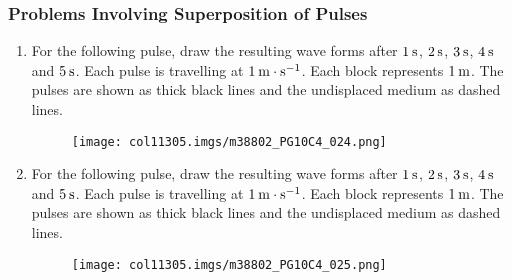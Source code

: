             \subsubsection{ Problems Involving Superposition of Pulses }
            \nopagebreak
            \label{m38802*id316401}\begin{enumerate}[noitemsep, label=\textbf{\arabic*}. ] 
            \label{m38802*uid55}\item For the following pulse, draw the resulting wave forms after $1\phantom{\rule{2pt}{0ex}}\mathrm{s}$, $2\phantom{\rule{2pt}{0ex}}\mathrm{s}$, $3\phantom{\rule{2pt}{0ex}}\mathrm{s}$, $4\phantom{\rule{2pt}{0ex}}\mathrm{s}$ and $5\phantom{\rule{2pt}{0ex}}\mathrm{s}$. Each pulse is travelling at $1\phantom{\rule{2pt}{0ex}}\mathrm{m}\ensuremath{\cdot}\mathrm{s}{}^{-1}$. Each block represents $1\phantom{\rule{2pt}{0ex}}\mathrm{m}$. The pulses are shown as thick black lines and the undisplaced medium as dashed lines.
    \setcounter{subfigure}{0}
	\begin{figure}[H] %
    \begin{center}
    \label{m38802*id316460!!!underscore!!!media}\label{m38802*id316460!!!underscore!!!printimage}\texttt{[image: col11305.imgs/m38802\_PG10C4\_024.png]} %
      \vspace{2pt}
    \vspace{.1in}
    \end{center}
 \end{figure}               \label{m38802*uid57}\item For the following pulse, draw the resulting wave forms after $1\phantom{\rule{2pt}{0ex}}\mathrm{s}$, $2\phantom{\rule{2pt}{0ex}}\mathrm{s}$, $3\phantom{\rule{2pt}{0ex}}\mathrm{s}$, $4\phantom{\rule{2pt}{0ex}}\mathrm{s}$ and $5\phantom{\rule{2pt}{0ex}}\mathrm{s}$. Each pulse is travelling at $1\phantom{\rule{2pt}{0ex}}\mathrm{m}\ensuremath{\cdot}\mathrm{s}{}^{-1}$. Each block represents $1\phantom{\rule{2pt}{0ex}}\mathrm{m}$. The pulses are shown as thick black lines and the undisplaced medium as dashed lines.
    \setcounter{subfigure}{0}
	\begin{figure}[H] %
    \begin{center}
    \label{m38802*id316477!!!underscore!!!media}\label{m38802*id316477!!!underscore!!!printimage}\texttt{[image: col11305.imgs/m38802\_PG10C4\_025.png]} %
      \vspace{2pt}

\end{center}
\end{figure}
\end{enumerate}
